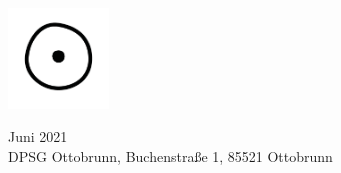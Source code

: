 \documentclass[../main.tex]{subfiles}
\begin{document}
\pagebreak
\fancyfoot{}
   \begin{center}
       \vspace*{6cm}
       \includegraphics[width=0.2\textwidth]{images/end_symbol.png}
      
       \vfill
       Juni 2021\\
       DPSG Ottobrunn, Buchenstraße 1, 85521 Ottobrunn    
   \end{center}
\end{document}

